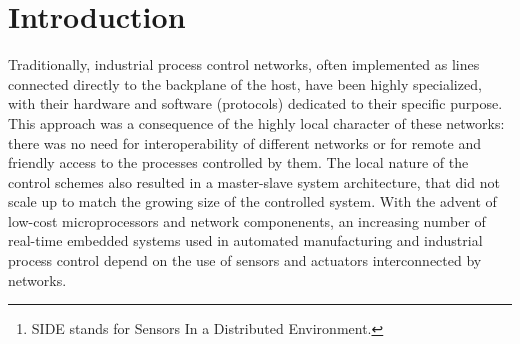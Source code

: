 \begin{abstract}
We introduce
SIDE\footnote{SIDE stands for Sensors In a
Distributed Environment.}---a software
package for developing control programs for reactive systems.
The package offers an object-oriented programming language (based on C++)
for describing configurations of reactive systems and specifying event-driven
threads of their control programs.
One distinctive feature of SIDE is that it can be used as a simulator:
some (or even all) components of the underlying physical network
can be virtual, which makes it possible to develop a control
program together with the physical system to be controlled.
Notably, the control program itself need not be aware that some parts of
its environment are not real.
This way, the same software can be
seamlessly used in simulation, emulation, and real-time
execution of the ``real'' system.
SIDE applications can be naturally distributed and interconnected via the
Internet.
In particular, control programs in SIDE can be monitored and
operated from remote locations via Java applets invoked from web pages.

\end{abstract}

\section{Introduction}

Traditionally, industrial process control networks, often implemented as
lines connected directly to the 
backplane of the host, have been highly specialized, with their hardware
and software (protocols) dedicated to their specific purpose.
This approach was a consequence of the highly
local character of these networks: there 
was no need for interoperability of different networks or for remote and
friendly access to the processes controlled by them.
The local nature of the control schemes also resulted
in a master-slave system architecture,
that did not scale up to match the growing size of the controlled
system.
With the advent of low-cost microprocessors 
and network componenents, an increasing number of
real-time embedded systems used in 
automated manufacturing and industrial process control depend on the
use of sensors and actuators interconnected by networks. 

